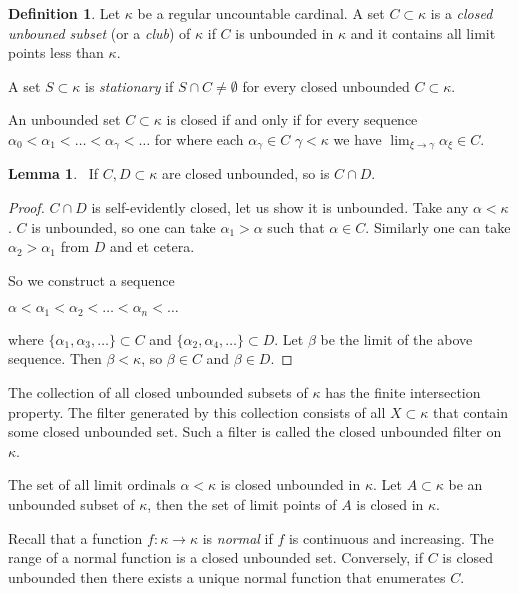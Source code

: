 \documentclass[8pt]{article}
\theoremstyle{definition}
\newtheorem{definition}{Definition}[section]
\theoremstyle{definition}
\theoremstyle{definition}
\theoremstyle{definition}
\theoremstyle{definition}
\theoremstyle{definition}
\theoremstyle{definition}
\theoremstyle{definition}
\newtheorem{lemma}{Lemma}[section]
\theoremstyle{definition}
\theoremstyle{definition}
\theoremstyle{definition}
\theoremstyle{definition}
\theoremstyle{definition}
\theoremstyle{definition}
\theoremstyle{question}
\begin{document}
\begin{definition}
  Let $\kappa$ be a regular uncountable cardinal. 
  A set $C \subset \kappa$ is a \emph{closed unbouned subset} (or a \emph{club}) of $\kappa$ if $C$ is unbounded in $\kappa$
  and it contains all limit points less than $\kappa$.

  A set $S \subset \kappa$ is \emph{stationary} if $S \cap C \neq \emptyset$ for every closed unbounded $C \subset \kappa$.
\end{definition}

An unbounded set $C \subset \kappa$ is closed if and only if for every sequence 
$\alpha_0 < \alpha_1 < \ldots < \alpha_{\gamma} < \ldots$ for where each $\alpha_{\gamma} \in C$ $\gamma < \kappa$
we have $\lim_{\xi \to \gamma} \alpha_{\xi} \in C$.

\begin{lemma}~\label{club:int}
  If $C, D \subset \kappa$ are closed unbounded, so is $C \cap D$.
\end{lemma}

\begin{proof}
  $C \cap D$ is self-evidently closed, let us show it is unbounded.
  Take any $\alpha < \kappa$. $C$ is unbounded, so one can take $\alpha_1 > \alpha$ such that $\alpha \in C$.
  Similarly one can take $\alpha_2 > \alpha_1$ from $D$ and et cetera.

  So we construct a sequence
  \begin{center}
    $\alpha < \alpha_1 < \alpha_2 < \ldots < \alpha_n < \ldots$
  \end{center}
  where $\{ \alpha_1, \alpha_3, \dots \} \subset C$ and $\{ \alpha_2, \alpha_4, \dots \} \subset D$. Let $\beta$
  be the limit of the above sequence. Then $\beta < \kappa$, so $\beta \in C$ and $\beta \in D$.
\end{proof}

The collection of all closed unbounded subsets of $\kappa$ has the finite intersection property.
The filter generated by this collection consists of all $X \subset \kappa$ that contain some closed unbounded set.
Such a filter is called the closed unbounded filter on $\kappa$.

The set of all limit ordinals $\alpha < \kappa$ is closed unbounded in $\kappa$. 
Let $A \subset \kappa$ be an unbounded subset of $\kappa$, then the set of limit points of $A$ is closed in $\kappa$.

Recall that a function $f : \kappa \to \kappa$ is \emph{normal} if $f$ is continuous and increasing.
The range of a normal function is a closed unbounded set. Conversely, if $C$ is closed unbounded
then there exists a unique normal function that enumerates $C$.
\end{document}
